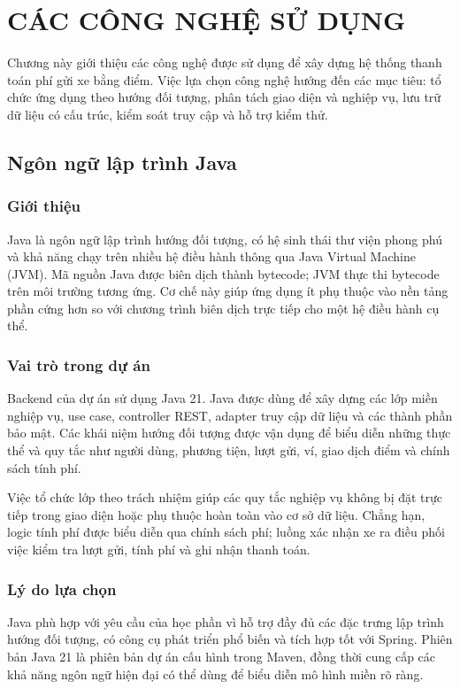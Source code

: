 \chapter{CÁC CÔNG NGHỆ SỬ DỤNG}

Chương này giới thiệu các công nghệ được sử dụng để xây dựng hệ thống thanh toán phí gửi xe bằng điểm. Việc lựa chọn công nghệ hướng đến các mục tiêu: tổ chức ứng dụng theo hướng đối tượng, phân tách giao diện và nghiệp vụ, lưu trữ dữ liệu có cấu trúc, kiểm soát truy cập và hỗ trợ kiểm thử.

\section{Ngôn ngữ lập trình Java}

\subsection{Giới thiệu}
Java là ngôn ngữ lập trình hướng đối tượng, có hệ sinh thái thư viện phong phú và khả năng chạy trên nhiều hệ điều hành thông qua Java Virtual Machine (JVM). Mã nguồn Java được biên dịch thành bytecode; JVM thực thi bytecode trên môi trường tương ứng. Cơ chế này giúp ứng dụng ít phụ thuộc vào nền tảng phần cứng hơn so với chương trình biên dịch trực tiếp cho một hệ điều hành cụ thể.

\subsection{Vai trò trong dự án}
Backend của dự án sử dụng Java 21. Java được dùng để xây dựng các lớp miền nghiệp vụ, use case, controller REST, adapter truy cập dữ liệu và các thành phần bảo mật. Các khái niệm hướng đối tượng được vận dụng để biểu diễn những thực thể và quy tắc như người dùng, phương tiện, lượt gửi, ví, giao dịch điểm và chính sách tính phí.

Việc tổ chức lớp theo trách nhiệm giúp các quy tắc nghiệp vụ không bị đặt trực tiếp trong giao diện hoặc phụ thuộc hoàn toàn vào cơ sở dữ liệu. Chẳng hạn, logic tính phí được biểu diễn qua chính sách phí; luồng xác nhận xe ra điều phối việc kiểm tra lượt gửi, tính phí và ghi nhận thanh toán.

\subsection{Lý do lựa chọn}
Java phù hợp với yêu cầu của học phần vì hỗ trợ đầy đủ các đặc trưng lập trình hướng đối tượng, có công cụ phát triển phổ biến và tích hợp tốt với Spring. Phiên bản Java 21 là phiên bản dự án cấu hình trong Maven, đồng thời cung cấp các khả năng ngôn ngữ hiện đại có thể dùng để biểu diễn mô hình miền rõ ràng.

